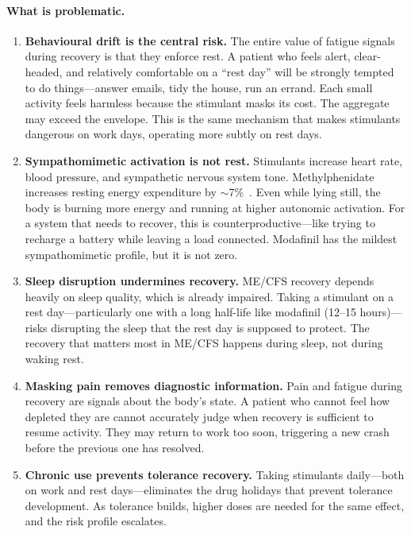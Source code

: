 \paragraph{What is problematic.}

\begin{enumerate}
    \item \textbf{Behavioural drift is the central risk.} The entire value of fatigue signals during recovery is that they enforce rest. A patient who feels alert, clear-headed, and relatively comfortable on a ``rest day'' will be strongly tempted to do things---answer emails, tidy the house, run an errand. Each small activity feels harmless because the stimulant masks its cost. The aggregate may exceed the envelope. This is the same mechanism that makes stimulants dangerous on work days, operating more subtly on rest days.

    \item \textbf{Sympathomimetic activation is not rest.} Stimulants increase heart rate, blood pressure, and sympathetic nervous system tone. Methylphenidate increases resting energy expenditure by ${\sim}$7\%~\cite{Leddy2012methylphenidateREE}. Even while lying still, the body is burning more energy and running at higher autonomic activation. For a system that needs to recover, this is counterproductive---like trying to recharge a battery while leaving a load connected. Modafinil has the mildest sympathomimetic profile, but it is not zero.

    \item \textbf{Sleep disruption undermines recovery.} ME/CFS recovery depends heavily on sleep quality, which is already impaired. Taking a stimulant on a rest day---particularly one with a long half-life like modafinil (12--15 hours)---risks disrupting the sleep that the rest day is supposed to protect. The recovery that matters most in ME/CFS happens during sleep, not during waking rest.

    \item \textbf{Masking pain removes diagnostic information.} Pain and fatigue during recovery are signals about the body's state. A patient who cannot feel how depleted they are cannot accurately judge when recovery is sufficient to resume activity. They may return to work too soon, triggering a new crash before the previous one has resolved.

    \item \textbf{Chronic use prevents tolerance recovery.} Taking stimulants daily---both on work and rest days---eliminates the drug holidays that prevent tolerance development. As tolerance builds, higher doses are needed for the same effect, and the risk profile escalates.
\end{enumerate}

